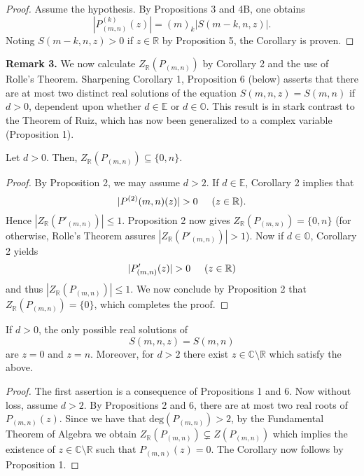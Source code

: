 \documentclass[]{amsart}
\begin{document}
\begin{proof}
Assume the hypothesis.  By Propositions 3 and 4B, one obtains
\[ |P^{(k)}_{(m,n)}(z)| = (m)_{k}|S(m-k,n,z)|. \]
Noting $S(m-k,n,z) > 0$ if $z \in \mathbb{R}$ by Proposition 5, the Corollary is proven.
\end{proof}
\noindent
\textbf{Remark 3.}  We now calculate $Z_{\mathbb{R}}(P_{(m,n)})$ by Corollary 2 and the use of Rolle's Theorem.  Sharpening Corollary 1, Proposition 6 (below) asserts that there are at most two distinct real solutions of the equation $S(m,n,z) = S(m,n)$ if $d > 0$, dependent upon whether $d \in \mathbb{E}$ or $d \in \mathbb{O}$.  This result is in stark contrast to the Theorem of Ruiz, which has now been generalized to a complex variable (Proposition 1).
\begin{prop}
Let $d > 0$.  Then, $Z_{\mathbb{R}}(P_{(m,n)}) \subseteq \{0,n\}$.
\end{prop}
\begin{proof}
By Proposition 2, we may assume $d > 2$.  If $d \in \mathbb{E}$, Corollary 2 implies that 
\[ |P^{(2)}(m,n)(z)| > 0 \hspace{5mm} (z \in \mathbb{R}).  \] 
Hence $|Z_{\mathbb{R}}(P'_{(m,n)})| \leq 1$.  Proposition 2 now gives $Z_{\mathbb{R}}(P_{(m,n)}) = \{0,n\}$ (for otherwise, Rolle's Theorem assures $|Z_{\mathbb{R}}(P'_{(m,n)})| > 1$). Now if $d \in \mathbb{O}$, Corollary 2 yields
\[ |P'_{(m,n)}(z)| > 0 \hspace{5mm} (z \in \mathbb{R}) \]
and thus $|Z_{\mathbb{R}}(P_{(m,n)})| \leq 1$.  We now conclude by Proposition 2 that $Z_{\mathbb{R}}(P_{(m,n)}) = \{0\}$, which completes the proof.
\end{proof}
\begin{cor}
If $d > 0$, the only possible real solutions of
\[ S(m,n,z) = S(m,n) \]
are $z = 0$ and $z = n$.  Moreover, for $d > 2$ there exist $z \in \mathbb{C}\setminus\mathbb{R}$ which satisfy the above.
\end{cor}
\begin{proof}
The first assertion is a consequence of Propositions 1 and 6.  Now without loss, assume $d > 2$.  By Propositions 2 and 6, there are at most two real roots of $P_{(m,n)}(z)$.  Since we have that $\mathrm{deg}(P_{(m,n)}) > 2$, by the Fundamental Theorem of Algebra we obtain $Z_{\mathbb{R}}(P_{(m,n)}) \subsetneq Z(P_{(m,n)})$  which implies the existence of $z \in \mathbb{C}\setminus\mathbb{R}$ such that $P_{(m,n)}(z) = 0$. The Corollary now follows by Proposition 1.
\end{proof}
\end{document}
